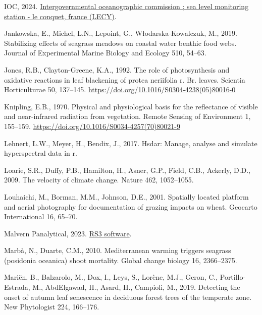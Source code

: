 \documentclass[
  letterpaper,
  DIV=11,
  numbers=noendperiod]{scrartcl}
\newlength{\cslhangindent}
\newenvironment{CSLReferences}[2] %
 {\begin{list}{}{%
  \setlength{\itemindent}{0pt}
  \setlength{\leftmargin}{0pt}
  \setlength{\parsep}{0pt}
  \ifodd #1
   \setlength{\leftmargin}{\cslhangindent}
   \setlength{\itemindent}{-1\cslhangindent}
  \fi
  \setlength{\itemsep}{#2\baselineskip}}}
 {\end{list}}
\begin{document}
\begin{CSLReferences}{1}{0}
IOC, 2024.
\href{https://www.ioc-sealevelmonitoring.org/station.php?code=lecy}{Intergovernmental
oceanographic commission ; sea level monitoring station - le conquet,
france (LECY)}.

Jankowska, E., Michel, L.N., Lepoint, G., Włodarska-Kowalczuk, M., 2019.
Stabilizing effects of seagrass meadows on coastal water benthic food
webs. Journal of Experimental Marine Biology and Ecology 510, 54--63.

Jones, R.B., Clayton-Greene, K.A., 1992. The role of photosynthesis and
oxidative reactions in leaf blackening of protea neriifolia r. Br.
leaves. Scientia Horticulturae 50, 137--145.
\url{https://doi.org/10.1016/S0304-4238(05)80016-0}

Knipling, E.B., 1970. Physical and physiological basis for the
reflectance of visible and near-infrared radiation from vegetation.
Remote Sensing of Environment 1, 155--159.
\url{https://doi.org/10.1016/S0034-4257(70)80021-9}

Lehnert, L.W., Meyer, H., Bendix, J., 2017. Hsdar: Manage, analyse and
simulate hyperspectral data in r.

Loarie, S.R., Duffy, P.B., Hamilton, H., Asner, G.P., Field, C.B.,
Ackerly, D.D., 2009. The velocity of climate change. Nature 462,
1052--1055.

Louhaichi, M., Borman, M.M., Johnson, D.E., 2001. Spatially located
platform and aerial photography for documentation of grazing impacts on
wheat. Geocarto International 16, 65--70.

Malvern Panalytical, 2023.
\href{https://www.malvernpanalytical.com/en/support/product-support/software/rs3}{RS3
software}.

Marbà, N., Duarte, C.M., 2010. Mediterranean warming triggers seagrass
(posidonia oceanica) shoot mortality. Global change biology 16,
2366--2375.

Mariën, B., Balzarolo, M., Dox, I., Leys, S., Lorène, M.J., Geron, C.,
Portillo-Estrada, M., AbdElgawad, H., Asard, H., Campioli, M., 2019.
Detecting the onset of autumn leaf senescence in deciduous forest trees
of the temperate zone. New Phytologist 224, 166--176.


\end{CSLReferences}
\end{document}
